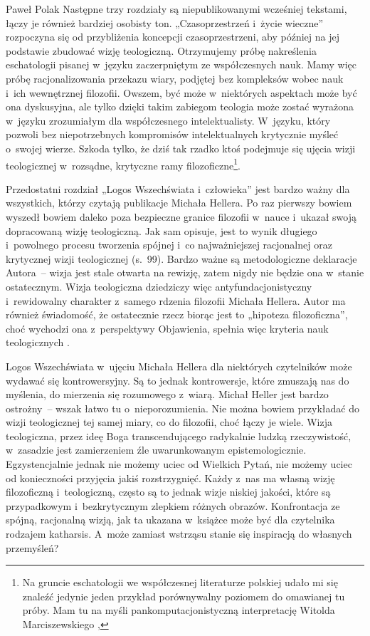\begin{recplenv}{Paweł Polak}
Następne trzy rozdziały są niepublikowanymi wcześniej tekstami, łączy je również bardziej osobisty ton.
„Czasoprzestrzeń i~życie wieczne” rozpoczyna się od przybliżenia koncepcji czasoprzestrzeni, aby później na jej
podstawie zbudować wizję teologiczną. Otrzymujemy próbę nakreślenia eschatologii pisanej w~języku zaczerpniętym ze
współczesnych nauk. Mamy więc próbę racjonalizowania przekazu wiary, podjętej bez kompleksów wobec nauk i~ich
wewnętrznej filozofii. Owszem, być może w~niektórych aspektach może być ona dyskusyjna, ale tylko dzięki takim zabiegom
teologia może zostać wyrażona w~języku zrozumiałym dla współczesnego intelektualisty. W~języku, który pozwoli bez
niepotrzebnych kompromisów intelektualnych krytycznie myśleć o~swojej wierze. Szkoda tylko, że dziś tak rzadko ktoś
podejmuje się ujęcia wizji teologicznej w~rozsądne, krytyczne ramy filozoficzne\footnote{Na gruncie eschatologii we
współczesnej literaturze polskiej udało mi się znaleźć jedynie jeden przykład porównywalny poziomem do omawianej tu
próby. Mam tu na myśli pankomputacjonistyczną interpretację Witolda Marciszewskiego
\parencite*{marciszewski_wszechswiat_1999},
}.  

Przedostatni rozdział „Logos Wszechświata i~człowieka” jest bardzo ważny dla wszystkich, którzy czytają publikacje
Michała Hellera. Po raz pierwszy bowiem wyszedł bowiem daleko poza bezpieczne granice filozofii w~nauce i~ukazał swoją
dopracowaną wizję teologiczną. Jak sam opisuje, jest to wynik długiego i~powolnego procesu tworzenia spójnej i~co
najważniejszej racjonalnej oraz krytycznej wizji teologicznej (s.~99). Bardzo ważne są metodologiczne deklaracje
Autora~-- wizja jest stale otwarta na rewizję, zatem nigdy nie będzie ona w~stanie ostatecznym. Wizja teologiczna dziedziczy
więc antyfundacjonistyczny i~rewidowalny charakter z~samego rdzenia filozofii Michała Hellera. Autor ma również
świadomość, że ostatecznie rzecz biorąc jest to „hipoteza filozoficzna”, choć wychodzi ona z~perspektywy Objawienia,
spełnia więc kryteria nauk teologicznych
\parencite[s.~54]{dzidek_poznanie_2006}.

Logos Wszechświata w~ujęciu Michała Hellera dla niektórych czytelników może wydawać się kontrowersyjny. Są to jednak
kontrowersje, które zmuszają nas do myślenia, do mierzenia się rozumowego z~wiarą. Michał Heller jest bardzo
ostrożny~-- wszak łatwo tu o~nieporozumienia. Nie można bowiem przykładać do wizji teologicznej tej samej miary, co do filozofii,
choć łączy je wiele. Wizja teologiczna, przez ideę Boga transcendującego radykalnie ludzką rzeczywistość, w~zasadzie
jest zamierzeniem źle uwarunkowanym epistemologicznie. Egzystencjalnie jednak nie możemy uciec od Wielkich Pytań, nie
możemy uciec od konieczności przyjęcia jakiś rozstrzygnięć. Każdy z~nas ma własną wizję filozoficzną i~teologiczną,
często są to jednak wizje niskiej jakości, które są przypadkowym i~bezkrytycznym zlepkiem różnych obrazów. Konfrontacja
ze spójną, racjonalną wizją, jak ta ukazana w~książce może być dla czytelnika rodzajem katharsis. A~może zamiast
wstrząsu stanie się inspiracją do własnych przemyśleń?


\end{recplenv}
